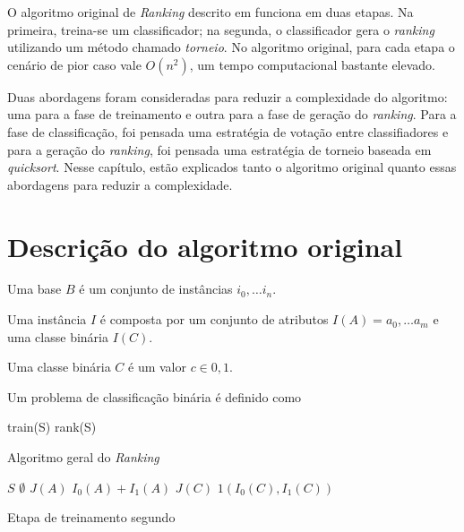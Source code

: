 O algoritmo original de \emph{Ranking} descrito em \cite{langford} funciona em duas etapas. Na primeira, treina-se um classificador;
na segunda, o classificador gera o \emph{ranking} utilizando um método chamado \emph{torneio}. No algoritmo original, para cada etapa
o cenário de pior caso vale $O(n^2)$, um tempo computacional bastante elevado.

Duas abordagens foram consideradas para reduzir a complexidade do algoritmo: uma para a fase de treinamento e outra para a fase de geração do \emph{ranking}. Para a fase de classificação, foi pensada uma estratégia de votação entre classifiadores e para a geração do \emph{ranking}, foi pensada uma estratégia de torneio baseada em \emph{quicksort}. Nesse capítulo, estão explicados tanto o algoritmo original quanto essas abordagens para reduzir a complexidade.

\section{Descrição do algoritmo original}

\begin{definition}
Uma base $B$ é um conjunto de instâncias ${i_0, \dots i_n}$.
\end{definition}

\begin{definition}
Uma instância $I$ é composta por um conjunto de atributos $I(A) = {a_0, \dots a_m}$ e uma classe binária $I(C)$.
\end{definition}

\begin{definition}
Uma classe binária $C$ é um valor $c \in {0, 1}$.
\end{definition}

\begin{definition}
Um problema de classificação binária é definido como
\end{definition}

\begin{algorithm}
\begin{algorithmic}

\STATE train(S)
\STATE rank(S)

\caption{Algoritmo geral do \emph{Ranking}}
\label{alg_ranking}

\end{algorithmic}
\end{algorithm}

\begin{algorithm}
\begin{algorithmic}
    
\STATE $S$ \gets $\emptyset$
            \STATE $J(A)$ \gets $I_0(A) + I_1(A)$
            \STATE $J(C)$ \gets $1(I_0(C), I_1(C))$
        \ENDIF
    \ENDFOR
\ENDFOR

\caption{Etapa de treinamento segundo \cite{langford}}
\label{alg_original_train}

\end{algorithmic}    
\end{algorithm}

